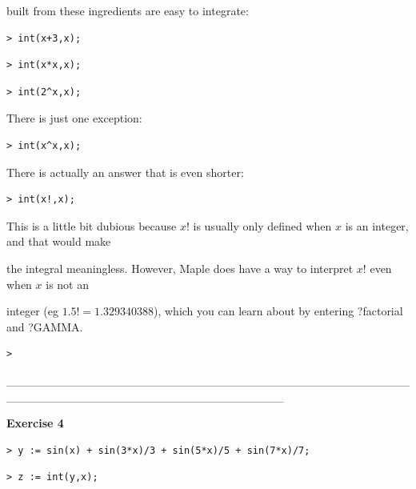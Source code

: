 \documentclass{article}
\begin{document}
\begin{Maple Normal}
built from these ingredients are easy to integrate:
\end{Maple Normal}
\begin{lstlisting}
> int(x+3,x);
\end{lstlisting}
\begin{lstlisting}
> int(x*x,x);
\end{lstlisting}
\begin{lstlisting}
> int(2^x,x);
\end{lstlisting}
\begin{Maple Normal}
There is just one exception:
\end{Maple Normal}
\begin{lstlisting}
> int(x^x,x);
\end{lstlisting}
\begin{Maple Normal}
There is actually an answer that is even shorter:
\end{Maple Normal}
\begin{lstlisting}
> int(x!,x);
\end{lstlisting}
\begin{Maple Normal}
This is a little bit dubious because 
$x !$ is usually only defined when 
$x$ is an integer, and that would make\

the integral meaningless.  However, Maple does have a way to interpret 
$x !$ even when 
$x$ is not an \

integer (eg 
$ 1.5!= 1.329340388$), which you can learn about by entering ?factorial and ?GAMMA.
\end{Maple Normal}
\begin{lstlisting}
> 
\end{lstlisting}
\begin{Maple Normal}
\_\_\_\_\_\_\_\_\_\_\_\_\_\_\_\_\_\_\_\_\_\_\_\_\_\_\_\_\_\_\_\_\_\_\_\_\_\_\_\_\_\_\_\_\_\_\_\_\_\_\_\_\_\_\_\_\_\_\_\_\_\_\_\_\_\_\_\_\_\_\_\_\_\_\_\_\_\_\_\_\_
\end{Maple Normal}
\begin{Maple Normal}
\textbf{Exercise 4}
\end{Maple Normal}
\begin{lstlisting}
> y := sin(x) + sin(3*x)/3 + sin(5*x)/5 + sin(7*x)/7;
\end{lstlisting}
\begin{lstlisting}
> z := int(y,x);
\end{lstlisting}
\end{document}
